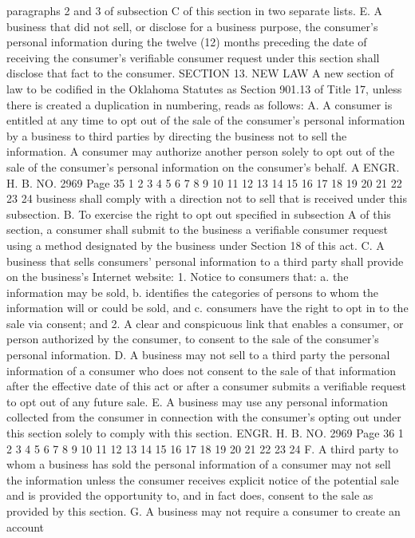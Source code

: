 paragraphs 2 and 3 of subsection C of this section in two separate
lists.
E. A business that did not sell, or disclose for a business
purpose, the consumer's personal information during the twelve (12)
months preceding the date of receiving the consumer's verifiable
consumer request under this section shall disclose that fact to the
consumer.
SECTION 13. NEW LAW A new section of law to be codified
in the Oklahoma Statutes as Section 901.13 of Title 17, unless there
is created a duplication in numbering, reads as follows:
A. A consumer is entitled at any time to opt out of the sale of
the consumer's personal information by a business to third parties
by directing the business not to sell the information. A consumer
may authorize another person solely to opt out of the sale of the
consumer's personal information on the consumer's behalf. A
ENGR. H. B. NO. 2969 Page 35
1
2
3
4
5
6
7
8
9
10
11
12
13
14
15
16
17
18
19
20
21
22
23
24
business shall comply with a direction not to sell that is received
under this subsection.
B. To exercise the right to opt out specified in subsection A
of this section, a consumer shall submit to the business a
verifiable consumer request using a method designated by the
business under Section 18 of this act.
C. A business that sells consumers' personal information to a
third party shall provide on the business's Internet website:
1. Notice to consumers that:
a. the information may be sold,
b. identifies the categories of persons to whom the
information will or could be sold, and
c. consumers have the right to opt in to the sale via
consent; and
2. A clear and conspicuous link that enables a consumer, or
person authorized by the consumer, to consent to the sale of the
consumer's personal information.
D. A business may not sell to a third party the personal
information of a consumer who does not consent to the sale of that
information after the effective date of this act or after a consumer
submits a verifiable request to opt out of any future sale.
E. A business may use any personal information collected from
the consumer in connection with the consumer's opting out under this
section solely to comply with this section.
ENGR. H. B. NO. 2969 Page 36
1
2
3
4
5
6
7
8
9
10
11
12
13
14
15
16
17
18
19
20
21
22
23
24
F. A third party to whom a business has sold the personal
information of a consumer may not sell the information unless the
consumer receives explicit notice of the potential sale and is
provided the opportunity to, and in fact does, consent to the sale
as provided by this section.
G. A business may not require a consumer to create an account
